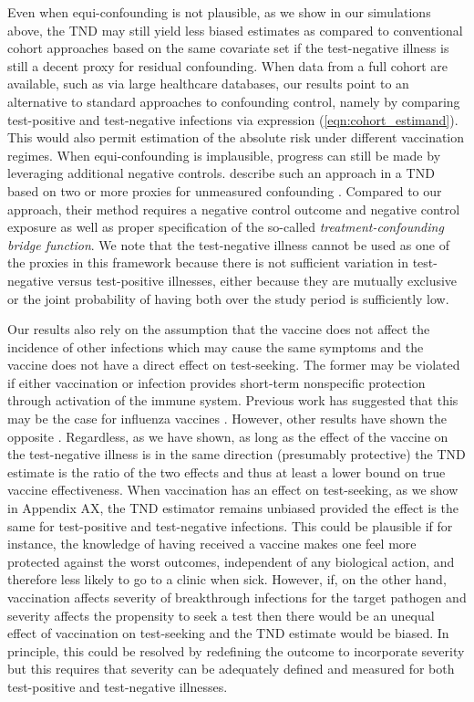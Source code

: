 \documentclass[11pt]{article}
\begin{document}
Even when equi-confounding is not plausible, as we show in our simulations above, the TND may still yield less biased estimates as compared to conventional cohort approaches based on the same covariate set if the test-negative illness is still a decent proxy for residual confounding. When data from a full cohort are available, such as via large healthcare databases, our results point to an alternative to standard approaches to confounding control, namely by comparing test-positive and test-negative infections via expression (\ref{eqn:cohort_estimand}). This would also permit estimation of the absolute risk under different vaccination regimes. When equi-confounding is implausible, progress can still be made by leveraging additional negative controls. \citeauthor{li_double_2023} describe such an approach in a TND based on two or more proxies for unmeasured confounding \cite{li_double_2023}. Compared to our approach, their method requires a negative control outcome and negative control exposure as well as proper specification of the so-called \textit{treatment-confounding bridge function}. We note that the test-negative illness cannot be used as one of the proxies in this framework because there is not sufficient variation in test-negative versus test-positive illnesses, either because they are mutually exclusive or the joint probability of having both over the study period is sufficiently low.

Our results also rely on the assumption that the vaccine does not affect the incidence of other infections which may cause the same symptoms and the vaccine does not have a direct effect on test-seeking. The former may be violated if either vaccination or infection provides short-term nonspecific protection through activation of the immune system. Previous work has suggested that this may be the case for influenza vaccines \cite{cowling_increased_2012}. However, other results have shown the opposite \cite{sundaram_influenza_2013}. Regardless, as we have shown, as long as the effect of the vaccine on the test-negative illness is in the same direction (presumably protective) the TND estimate is the ratio of the two effects and thus at least a lower bound on true vaccine effectiveness. When vaccination has an effect on test-seeking, as we show in Appendix AX, the TND estimator remains unbiased provided the effect is the same for test-positive and test-negative infections. This could be plausible if for instance, the knowledge of having received a vaccine makes one feel more protected against the worst outcomes, independent of any biological action, and therefore less likely to go to a clinic when sick. However, if, on the other hand, vaccination affects severity of breakthrough infections for the target pathogen and severity affects the propensity to seek a test then there would be an unequal effect of vaccination on test-seeking and the TND estimate would be biased. In principle, this could be resolved by redefining the outcome to incorporate severity but this requires that severity can be adequately defined and measured for both test-positive and test-negative illnesses. 
\end{document}
